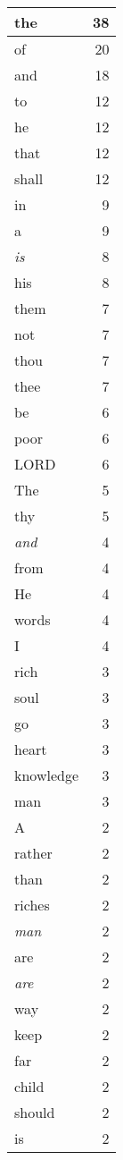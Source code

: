 \begin{center}
\begin{longtable}{l|r}
the & 38\\ \hline 
of & 20\\ \hline 
and & 18\\ \hline 
to & 12\\ \hline 
he & 12\\ \hline 
that & 12\\ \hline 
shall & 12\\ \hline 
in & 9\\ \hline 
a & 9\\ \hline 
\emph{is} & 8\\ \hline 
his & 8\\ \hline 
them & 7\\ \hline 
not & 7\\ \hline 
thou & 7\\ \hline 
thee & 7\\ \hline 
be & 6\\ \hline 
poor & 6\\ \hline 
LORD & 6\\ \hline 
The & 5\\ \hline 
thy & 5\\ \hline 
\emph{and} & 4\\ \hline 
from & 4\\ \hline 
He & 4\\ \hline 
words & 4\\ \hline 
I & 4\\ \hline 
rich & 3\\ \hline 
soul & 3\\ \hline 
go & 3\\ \hline 
heart & 3\\ \hline 
knowledge & 3\\ \hline 
man & 3\\ \hline 
A & 2\\ \hline 
rather & 2\\ \hline 
than & 2\\ \hline 
riches & 2\\ \hline 
\emph{man} & 2\\ \hline 
are & 2\\ \hline 
\emph{are} & 2\\ \hline 
way & 2\\ \hline 
keep & 2\\ \hline 
far & 2\\ \hline 
child & 2\\ \hline 
should & 2\\ \hline 
is & 2\\ \hline 

\end{longtable}
\end{center}
